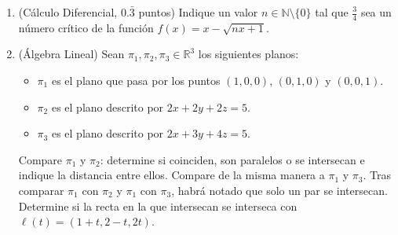 \documentclass{fmbvecto}
\begin{document}
\begin{enumerate}
    \item (Cálculo Diferencial, \(0.\bar{3}\) puntos) Indique un valor \(n \in \mathbb{N} \setminus \{0\}\) tal que \(\frac{3}{4}\) sea un número crítico de la función \(f(x)=x-\sqrt{nx+1}\).

    
    \item (Álgebra Lineal) Sean \(\pi_1, \pi_2, \pi_3 \in \mathbb{R}^3\) los siguientes planos:
    \begin{itemize}
        \item \(\pi_1\) es el plano que pasa por los puntos \((1, 0, 0)\), \((0, 1, 0)\) y \((0, 0, 1)\).
        \item \(\pi_2\) es el plano descrito por \(2x + 2y + 2z = 5\).
        \item \(\pi_3\) es el plano descrito por \(2x + 3y + 4z = 5\).
    \end{itemize}
    \begin{enumerate}
        \itemp[\(0.1\bar{6}\)] Compare \(\pi_1\) y \(\pi_2\): determine si coinciden, son paralelos o se intersecan e indique la distancia entre ellos.
        \itemp[\(0.1\bar{6}\)] Compare de la misma manera a \(\pi_1\) y \(\pi_3\).
        \itemp[\(0.\bar{3}\)] Tras comparar \(\pi_1\) con \(\pi_2\) y \(\pi_1\) con \(\pi_3\), habrá notado que solo un par se intersecan. Determine si la recta en la que intersecan se interseca con \(\ell(t) = (1+t, 2-t, 2t)\).
    \end{enumerate}
\end{enumerate}
\end{document}

